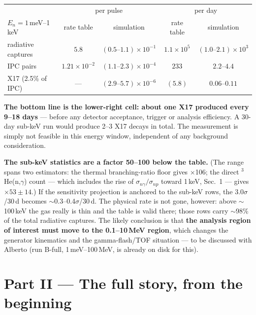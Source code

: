 \documentclass[11pt,a4paper]{article}
\newcommand{\He}[1]{$^{#1}$He}
\newcommand{\snp}{\sigma_{np}}
\newcommand{\sng}{\sigma_{n\gamma}}
\begin{document}
\begin{center}
\begin{tabular}{lcc|cc}
\hline
 & \multicolumn{2}{c|}{per pulse} & \multicolumn{2}{c}{per day} \\
$E_n = 1$\,meV--1\,keV & rate table & simulation & rate table & simulation \\
\hline
radiative captures & $5.8$ & $(0.5\text{--}1.1)\times10^{-1}$
                   & $1.1\times10^{5}$ & $(1.0\text{--}2.1)\times10^{3}$ \\
IPC pairs          & $1.21\times10^{-2}$ & $(1.1\text{--}2.3)\times10^{-4}$
                   & $233$ & $2.2\text{--}4.4$ \\
X17 (2.5\% of IPC) & --- & $(2.9\text{--}5.7)\times10^{-6}$
                   & $(5.8)$ & $0.06\text{--}0.11$ \\
\hline
\end{tabular}
\end{center}

\noindent\textbf{The bottom line is the lower-right cell: about one X17
produced every 9--18 days} --- before any detector acceptance, trigger or
analysis efficiency. A 30-day sub-keV run would produce 2--3 X17 decays in
total. The measurement is simply not feasible in this energy window,
independent of any background consideration.

\noindent\textbf{The sub-keV statistics are a factor 50--100 below the
table.} (The range spans two estimators: the thermal branching-ratio floor
gives $\times$106; the direct \He{3}(n,$\gamma$) count --- which includes
the rise of $\sng/\snp$ toward 1\,keV, Sec.~1 --- gives
$\times53\pm14$.) If the sensitivity projection is anchored to the sub-keV
rows, the $3.0\sigma$/30\,d becomes $\sim$0.3--0.4$\sigma$/30\,d. The
physical rate is not gone, however: above $\sim$100\,keV the gas really is
thin and the table is valid there; those rows carry $\sim$98\% of the total
radiative captures.
The likely conclusion is that \textbf{the analysis region of interest must
move to the 0.1--10\,MeV region}, which changes the generator kinematics and
the gamma-flash/TOF situation --- to be discussed with Alberto (run B-full,
1\,meV--100\,MeV, is already on disk for this).

\clearpage
\section*{Part II --- The full story, from the beginning}
\end{document}
